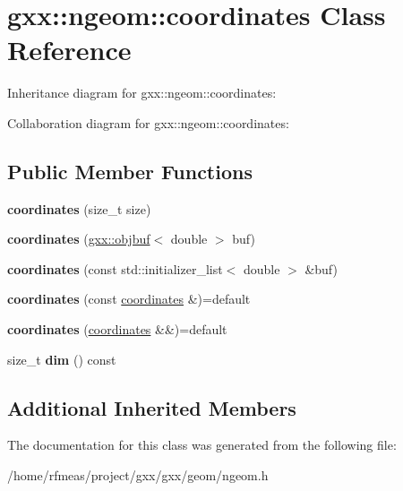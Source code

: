 \hypertarget{classgxx_1_1ngeom_1_1coordinates}{}\section{gxx\+:\+:ngeom\+:\+:coordinates Class Reference}
\label{classgxx_1_1ngeom_1_1coordinates}


Inheritance diagram for gxx\+:\+:ngeom\+:\+:coordinates\+:


Collaboration diagram for gxx\+:\+:ngeom\+:\+:coordinates\+:
\subsection*{Public Member Functions}
\begin{DoxyCompactItemize}
\item 
{\bfseries coordinates} (size\+\_\+t size)\hypertarget{classgxx_1_1ngeom_1_1coordinates_a59e2d7b6290bd5288e0b95539a41bd14}{}\label{classgxx_1_1ngeom_1_1coordinates_a59e2d7b6290bd5288e0b95539a41bd14}

\item 
{\bfseries coordinates} (\hyperlink{classgxx_1_1object__buffer}{gxx\+::objbuf}$<$ double $>$ buf)\hypertarget{classgxx_1_1ngeom_1_1coordinates_aa53f4baae93c26af40459d07ebc09600}{}\label{classgxx_1_1ngeom_1_1coordinates_aa53f4baae93c26af40459d07ebc09600}

\item 
{\bfseries coordinates} (const std\+::initializer\+\_\+list$<$ double $>$ \&buf)\hypertarget{classgxx_1_1ngeom_1_1coordinates_a6c5916f60a54f73e3315dc8f94c127b9}{}\label{classgxx_1_1ngeom_1_1coordinates_a6c5916f60a54f73e3315dc8f94c127b9}

\item 
{\bfseries coordinates} (const \hyperlink{classgxx_1_1ngeom_1_1coordinates}{coordinates} \&)=default\hypertarget{classgxx_1_1ngeom_1_1coordinates_a16c22038643673ea03773792a7fe72ff}{}\label{classgxx_1_1ngeom_1_1coordinates_a16c22038643673ea03773792a7fe72ff}

\item 
{\bfseries coordinates} (\hyperlink{classgxx_1_1ngeom_1_1coordinates}{coordinates} \&\&)=default\hypertarget{classgxx_1_1ngeom_1_1coordinates_ab8e18c964d42d35b191edf521a2a0200}{}\label{classgxx_1_1ngeom_1_1coordinates_ab8e18c964d42d35b191edf521a2a0200}

\item 
size\+\_\+t {\bfseries dim} () const \hypertarget{classgxx_1_1ngeom_1_1coordinates_af78809d856d39a9521e8f862bda570e5}{}\label{classgxx_1_1ngeom_1_1coordinates_af78809d856d39a9521e8f862bda570e5}

\end{DoxyCompactItemize}
\subsection*{Additional Inherited Members}


The documentation for this class was generated from the following file\+:\begin{DoxyCompactItemize}
\item 
/home/rfmeas/project/gxx/gxx/geom/ngeom.\+h\end{DoxyCompactItemize}

